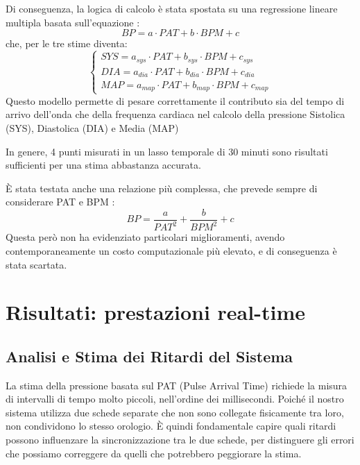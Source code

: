 \documentclass[11pt,a4paper]{article}
\begin{document}
Di conseguenza, la logica di calcolo è stata spostata su una regressione lineare multipla basata sull'equazione \cite{lazazzera2019}:
\begin{equation}
    BP = a \cdot PAT + b \cdot BPM + c
\end{equation}
che, per le tre stime diventa:
\begin{equation}
\begin{cases} 
    SYS = a_{sys} \cdot PAT + b_{sys} \cdot BPM + c_{sys} \\
    DIA = a_{dia} \cdot PAT + b_{dia} \cdot BPM + c_{dia} \\
    MAP = a_{map} \cdot PAT + b_{map} \cdot BPM + c_{map}
\end{cases}
\end{equation}
Questo modello permette di pesare correttamente il contributo sia del tempo di arrivo dell'onda che della frequenza cardiaca nel calcolo della pressione Sistolica (SYS), Diastolica (DIA) e Media (MAP)


In genere, 4 punti misurati in un lasso temporale di 30 minuti sono risultati sufficienti per una stima abbastanza accurata.

È stata testata anche una relazione più complessa, che prevede sempre di considerare PAT e BPM \cite{Zhou2023}: \begin{equation}
    BP = \frac{a}{PAT^2} + \frac{b}{BPM^2} + c
\end{equation}
Questa però non ha evidenziato particolari miglioramenti, avendo contemporaneamente un costo computazionale più elevato, e di conseguenza è stata scartata.

\section{Risultati: prestazioni real-time}
\subsection{Analisi e Stima dei Ritardi del Sistema}
La stima della pressione basata sul PAT (Pulse Arrival Time) richiede la misura di intervalli di tempo molto piccoli, nell'ordine dei millisecondi. Poiché il nostro sistema utilizza due schede separate che non sono collegate fisicamente tra loro, non condividono lo stesso orologio. È quindi fondamentale capire quali ritardi possono influenzare la sincronizzazione tra le due schede, per distinguere gli errori che possiamo correggere da quelli che potrebbero peggiorare la stima.
\end{document}
